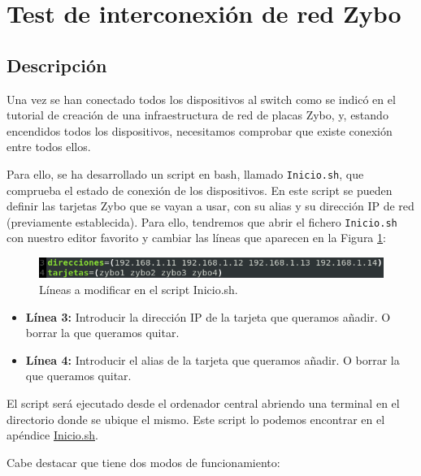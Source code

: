\section{Test de interconexión de red Zybo}
\hypertarget{TestConexion}{}
\subsection{Descripción}
Una vez se han conectado todos los dispositivos al switch como se indicó en el tutorial de creación de una infraestructura de red de placas Zybo, y, estando encendidos todos los dispositivos, necesitamos comprobar que existe conexión entre todos ellos.

Para ello, se ha desarrollado un script en bash, llamado \texttt{Inicio.sh}, que comprueba el estado de conexión de los dispositivos. En este script se pueden definir las tarjetas Zybo que se vayan a usar, con su alias y su dirección IP de red (previamente establecida). Para ello, tendremos que abrir el fichero \texttt{Inicio.sh} con nuestro editor favorito y cambiar las líneas que aparecen en la Figura \ref{Líneas a modificar en el script Inicio.sh}:
\begin{figure}[h]
	\centering
	\includegraphics[scale=0.9]{Anexos/Anexo2/Test/Script.png}
	\caption{Líneas a modificar en el script Inicio.sh.}
	\label{Líneas a modificar en el script Inicio.sh}
\end{figure}
\begin{itemize}
	\item \textbf{Línea 3:} Introducir la dirección IP de la tarjeta que queramos añadir. O borrar la que queramos quitar.
	\item \textbf{Línea 4:} Introducir el alias de la tarjeta que queramos añadir. O borrar la que queramos quitar.
\end{itemize}

El script será ejecutado desde el ordenador central abriendo una terminal en el directorio donde se ubique el mismo. Este script lo podemos encontrar en el apéndice \hyperlink{ScriptConexion}{Inicio.sh}.

Cabe destacar que tiene dos modos de funcionamiento:

